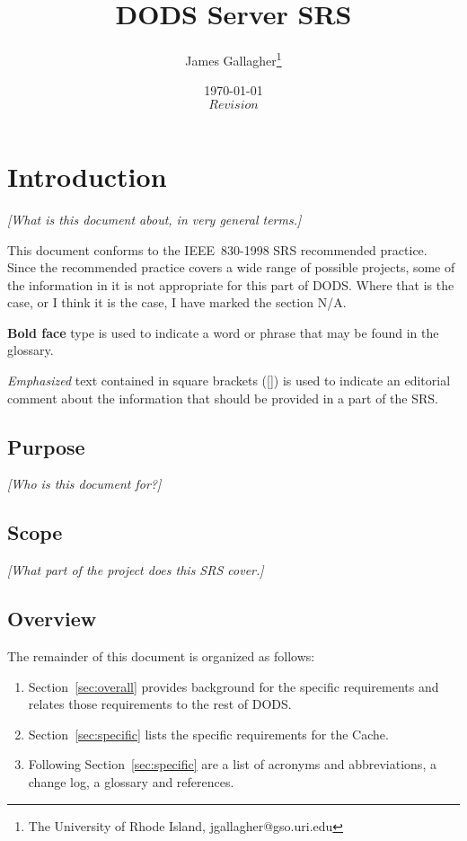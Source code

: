 \documentclass{article}
\begin{document}
\title{DODS Server SRS}
\author{James Gallagher\thanks{The University of Rhode Island, jgallagher@gso.uri.edu}}
\date{\today \\ $Revision$ }



\maketitle
\tableofcontents


\section{Introduction}
\emph{[What is this document about, in very general terms.]}

This document conforms to the IEEE~830-1998 \ac{SRS} recommended practice.
Since the recommended practice covers a wide range of possible projects, some
of the information in it is not appropriate for this part of \acs{DODS}.
Where that is the case, or I think it is the case, I have marked the section
N/A.

\textbf{Bold face} type is used to indicate a word or phrase that may be
found in the glossary.

\emph{Emphasized} text contained in square brackets ([]) is used to indicate
an editorial comment about the information that should be provided in a part
of the \ac{SRS}.

\subsection{Purpose}
\emph{[Who is this document for?]}

\subsection{Scope}
\emph{[What part of the project does this SRS cover.]}

\subsection{Overview}

The remainder of this document is organized as follows:
\begin{enumerate}
\item Section~\ref{sec:overall} provides background for the specific
requirements and relates those requirements to the rest of DODS.
\item Section~\ref{sec:specific} lists the specific requirements for the
  Cache.
\item Following Section~\ref{sec:specific} are a list of acronyms and
  abbreviations, a change log, a glossary and references.
\end{enumerate}
\end{document}
